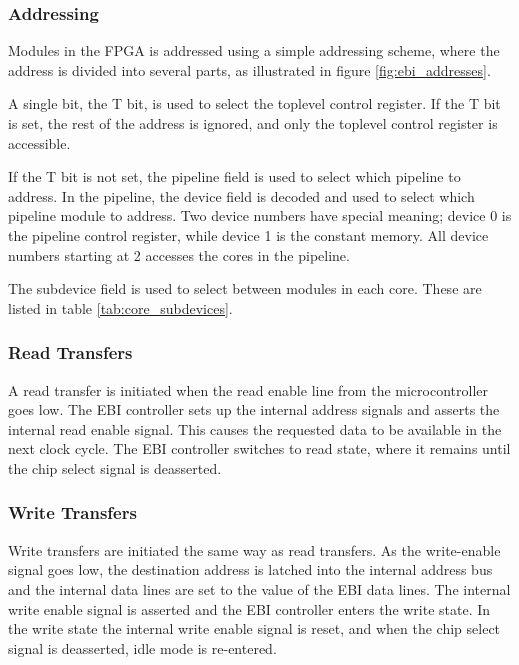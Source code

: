 

\FloatBarrier
\subsubsection{Addressing}

Modules in the FPGA is addressed using a simple addressing scheme, where the
address is divided into several parts, as illustrated in figure \ref{fig:ebi_addresses}.



A single bit, the T bit, is used to select the toplevel control register.
If the T bit is set, the rest of the address is ignored, and only the toplevel
control register is accessible.

If the T bit is not set, the pipeline field is used to select which pipeline
to address. In the pipeline, the device field is decoded and used to select
which pipeline module to address. Two device numbers have special meaning;
device 0 is the pipeline control register, while device 1 is the constant
memory. All device numbers starting at 2 accesses the cores in the pipeline.

The subdevice field is used to select between modules in each core. These
are listed in table \ref{tab:core_subdevices}.



\FloatBarrier
\subsubsection{Read Transfers}

A read transfer is initiated when the read enable line from the microcontroller 
goes low. The EBI controller sets up the internal address signals and asserts 
the internal read enable signal. This causes the requested data to be available 
in the next clock cycle. The EBI controller switches to read state, where it 
remains until the chip select signal is deasserted.

\subsubsection{Write Transfers}

Write transfers are initiated the same way as read transfers. As the 
write-enable signal goes low, the destination address is latched into the 
internal address bus and the internal data lines are set to the value of the 
EBI data lines. The internal write enable signal is asserted and the EBI 
controller enters the write state. In the write state the internal write enable 
signal is reset, and when the chip select signal is deasserted, idle mode
is re-entered.
